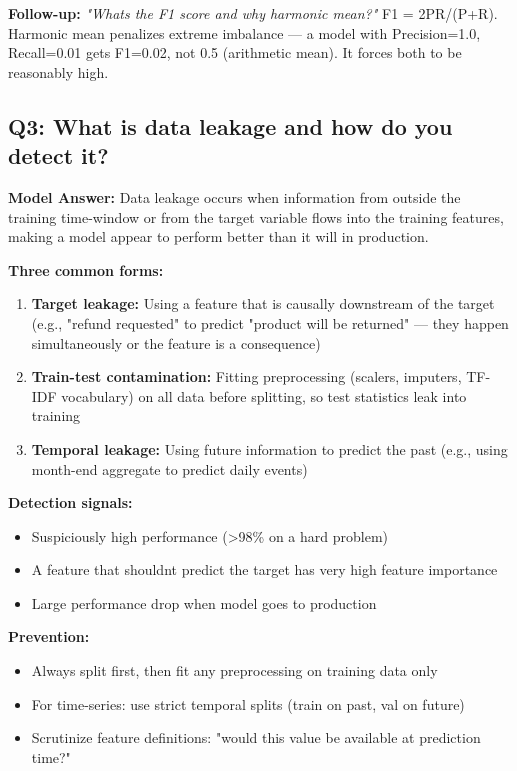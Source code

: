 \documentclass[11pt]{article}
\providecommand{\tightlist}{\setlength{\itemsep}{1pt}\setlength{\parskip}{0pt}}
\begin{document}
\textbf{Follow-up:} \emph{"What\textquotesingle s the F1 score and why harmonic mean?"}
F1 = 2PR/(P+R). Harmonic mean penalizes extreme imbalance --- a model with Precision=1.0, Recall=0.01 gets F1=0.02, not 0.5 (arithmetic mean). It forces both to be reasonably high.

\subsection{Q3: What is data leakage and how do you detect it?}\label{q3-what-is-data-leakage-and-how-do-you-detect-it}

\textbf{Model Answer:}
Data leakage occurs when information from outside the training time-window or from the target variable flows into the training features, making a model appear to perform better than it will in production.

\textbf{Three common forms:}

\begin{enumerate}
\def\labelenumi{\arabic{enumi}.}
\tightlist
\item
  \textbf{Target leakage:} Using a feature that is causally downstream of the target (e.g., "refund requested" to predict "product will be returned" --- they happen simultaneously or the feature is a consequence)
\item
  \textbf{Train-test contamination:} Fitting preprocessing (scalers, imputers, TF-IDF vocabulary) on all data before splitting, so test statistics leak into training
\item
  \textbf{Temporal leakage:} Using future information to predict the past (e.g., using month-end aggregate to predict daily events)
\end{enumerate}

\textbf{Detection signals:}

\begin{itemize}
\tightlist
\item
  Suspiciously high performance (\textgreater98\% on a hard problem)
\item
  A feature that shouldn\textquotesingle t predict the target has very high feature importance
\item
  Large performance drop when model goes to production
\end{itemize}

\textbf{Prevention:}

\begin{itemize}
\tightlist
\item
  Always split first, then fit any preprocessing on training data only
\item
  For time-series: use strict temporal splits (train on past, val on future)
\item
  Scrutinize feature definitions: "would this value be available at prediction time?"
\end{itemize}
\end{document}
